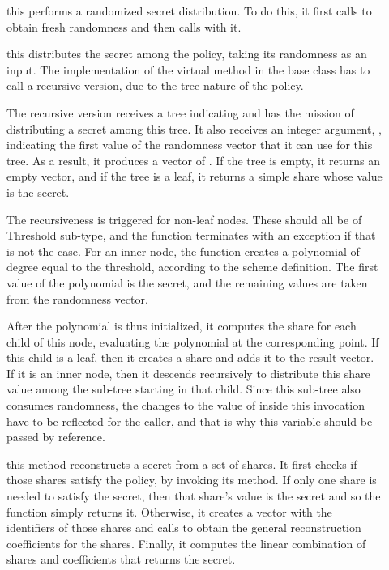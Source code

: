 \documentclass{article}
\begin{document}
\begin{description}
\item[] this performs a randomized secret distribution. To do this, it first calls  to obtain fresh randomness and then calls  with it.
\item[] this distributes the secret among the policy, taking its randomness as an input. The implementation of the virtual method in the base class has to call a recursive version, due to the tree-nature of the policy.

The recursive version receives a tree indicating and has the mission of distributing a secret among this tree. It also receives an integer argument, , indicating the first value of the randomness vector that it can use for this tree.
As a result, it produces a vector of \cST. If the tree is empty, it returns an empty vector, and if the tree is a leaf, it returns a simple share whose value is the secret.

The recursiveness is triggered for non-leaf nodes. These should all be of Threshold sub-type, and the function terminates with an exception if that is not the case. For an inner node, the function creates a polynomial of degree equal to the threshold, according to the scheme definition. The first value of the polynomial is the secret, and the remaining values are taken from the randomness vector. 

After the polynomial is thus initialized, it computes the share for each child of this node, evaluating the polynomial at the corresponding point. If this child is a leaf, then it creates a share and adds it to the result vector. If it is an inner node, then it descends recursively to distribute this share value among the sub-tree starting in that child. Since this sub-tree also consumes randomness, the changes to the value of  inside this invocation have to be reflected for the caller, and that is why this variable should be passed by reference.


\item[] this method reconstructs a secret from a set of shares. It first checks if those shares satisfy the policy, by invoking its  method. If only one share is needed to satisfy the secret, then that share's value is the secret and so the function simply returns it. Otherwise, it creates a vector with the identifiers of those shares and calls  to obtain the general reconstruction coefficients for the shares. Finally, it computes the linear combination of shares and coefficients that returns the secret.
\end{description}
\end{document}
